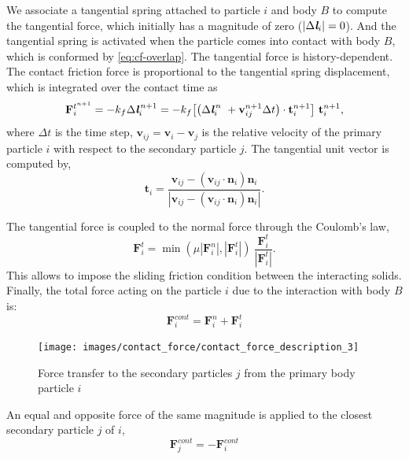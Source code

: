 \documentclass[preprint,12pt]{elsarticle}
\newcommand{\ten}[1]{\ensuremath{\mathbf{#1}}}
\begin{document}
We associate a tangential spring attached to particle $i$ and body $B$ to
compute the tangential force, which initially has a magnitude of zero
($|\Delta \textit{\textbf{l}}_i|=0$). And the tangential spring is activated
when the particle comes into contact with body $B$, which is conformed by
\cref{eq:cf-overlap}. The tangential force is history-dependent. The contact
friction force is proportional to the tangential spring displacement, which is
integrated over the contact time as
\begin{equation}
  \label{eq:tangential-force}
  \ten{F}_{i}^{t^{n+1}} =
  -k_f \Delta \textit{\textbf{l}}_i^{\,n + 1} =
  -k_f \big[\big(\Delta {\textit{\textbf{l}}}_i^{\,n} \
  + \ten{v}_{ij}^{n + 1} \Delta t\big) \cdot \ten{t}_i^{n + 1} \big] \
  \ten{t}_i^{n + 1},
\end{equation}
where $\Delta t$ is the time step, $\ten{v}_{ij} = \ten{v}_{i} - \ten{v}_j$ is
the relative velocity of the primary particle $i$ with respect to the
secondary particle $j$. The tangential unit vector is computed by,
\begin{equation}
  \label{eq:tangential-vect}
  \ten{t}_i = \frac{\ten{v}_{ij} - (\ten{v}_{ij} \cdot \ten{n}_i) \ten{n}_i}{|\ten{v}_{ij} - (\ten{v}_{ij} \cdot \ten{n}_i) \ten{n}_i|}.
\end{equation}

The tangential force is coupled to the normal force through the Coulomb's law,
\begin{equation}
  \label{eq:Coulomb-law}
  \ten{F}_{i}^{t} = \min(\mu |\ten{F}_{i}^{n}|, |\ten{F}_{i}^{t}|) \
  \frac{\ten{F}_{i}^{t}}{|\ten{F}_{i}^{t}|}.
\end{equation}
This allows to impose the sliding friction condition between the interacting
solids. Finally, the total force acting on the particle $i$ due to the
interaction with body $B$ is:
\begin{equation}
  \label{eq:contact-force}
  \ten{F}_{i}^{cont} = \ten{F}_{i}^{n} + \ten{F}_{i}^{t}
\end{equation}

\begin{figure}[!htpb]
  \centering
  \texttt{[image: images/contact\_force/contact\_force\_description\_3]}
  \caption{Force transfer to the secondary particles $j$ from the primary body particle $i$}
\label{fig:secondary_particle_contact_foce_transfer}
\end{figure}
An equal and opposite force of the same magnitude is applied to the closest
secondary particle $j$ of $i$,
\begin{equation}
  \label{eq:contact-force}
  \ten{F}_{j}^{cont} = - \ten{F}_{i}^{cont}
\end{equation}
\end{document}
